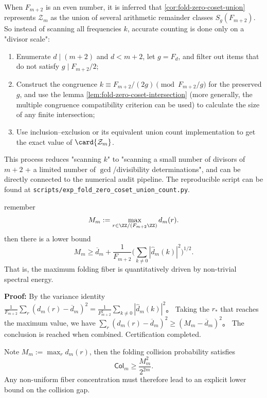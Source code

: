 \begin{remark}\label{rem:fold-zero-coset-algorithm}
When \(F_{m+2}\) is an even number, it is inferred that \ref{cor:fold-zero-coset-union} represents \(\mathcal{Z}_m\) as the union of several arithmetic remainder classes \(S_g(F_{m+2})\).
So instead of scanning all frequencies \(k\), accurate counting is done only on a "divisor scale":
\begin{enumerate}
\item Enumerate \(d\mid(m+2)\) and \(d<m+2\), let \(g=F_d\), and filter out items that do not satisfy \(g\mid F_{m+2}/2\);
\item Construct the congruence \(k\equiv F_{m+2}/(2g)\pmod{F_{m+2}/g}\) for the preserved \(g\), and use the lemma \ref{lem:fold-zero-coset-intersection} (more generally, the multiple congruence compatibility criterion can be used) to calculate the size of any finite intersection;
\item Use inclusion--exclusion or its equivalent union count implementation to get the exact value of \(\card{\mathcal{Z}_m}\).
\end{enumerate}
This process reduces "scanning \(k\)" to "scanning a small number of divisors of \(m+2\) + a limited number of \(\gcd\)/divisibility determinations", and can be directly connected to the numerical audit pipeline.
The reproducible script can be found at \texttt{scripts/exp\_fold\_zero\_coset\_union\_count.py}.
\end{remark}

\begin{theorem}
\label{thm:fold-max-fiber-spectrum}
remember
\[
M_m:=\max_{r\in\ZZ/(F_{m+2}\ZZ)} d_m(r).
\]
then there is a lower bound
\[
M_m\ge \overline d_m+\frac{1}{F_{m+2}}\Biggl(\sum_{k\ne 0}|\widehat d_m(k)|^2\Biggr)^{1/2}.
\]
That is, the maximum folding fiber is quantitatively driven by non-trivial spectral energy.
\end{theorem}

\textbf{Proof:}
By the variance identity
\(
\frac{1}{F_{m+2}}\sum_r(d_m(r)-\overline d_m)^2=\frac{1}{F_{m+2}^2}\sum_{k\ne 0}|\widehat d_m(k)|^2
\)。
Taking the $r_*$ that reaches the maximum value, we have
\(
\sum_r(d_m(r)-\overline d_m)^2\ge (M_m-\overline d_m)^2
\)。
The conclusion is reached when combined. Certification completed.

\begin{theorem}
\label{thm:fold-collision-max-fiber}
Note $M_m:=\max_r d_m(r)$, then the folding collision probability satisfies
\[
\mathsf{Col}_m\ge \frac{M_m^2}{2^{2m}}.
\]
Any non-uniform fiber concentration must therefore lead to an explicit lower bound on the collision gap.
\end{theorem}

